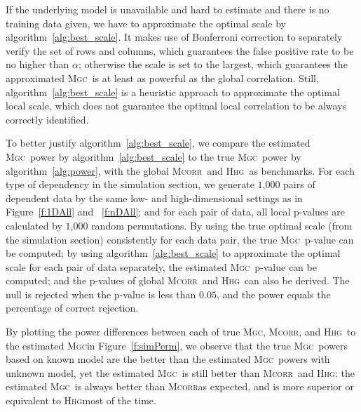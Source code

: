 \documentclass[11pt]{article}
\providecommand{\sct}[1]{{\normalfont\textsc{#1}}}
\newcommand{\Mgc}{\sct{Mgc}}
\newcommand{\Hhg}{\sct{Hhg}}
\newcommand{\Mcorr}{\sct{Mcorr}}
\begin{document}
If the underlying model is unavailable and hard to estimate and there is no training data given, we have to approximate the optimal scale by algorithm~\ref{alg:best_scale}. It makes use of Bonferroni correction to separately verify the set of rows and columns, which guarantees the false positive rate to be no higher than $\alpha$; otherwise the scale is set to the largest, which guarantees the approximated \Mgc~is at least as powerful as the global correlation. Still, algorithm~\ref{alg:best_scale} is a heuristic approach to approximate the optimal local scale, which does not guarantee the optimal local correlation to be always correctly identified.


To better justify algorithm~\ref{alg:best_scale}, we compare the estimated \Mgc~power by algorithm~\ref{alg:best_scale} to the true \Mgc~power by algorithm~\ref{alg:power}, with the global \Mcorr~and \Hhg~as benchmarks. For each type of dependency in the simulation section, we generate $1$,$000$ pairs of dependent data by the same low- and high-dimensional settings as in Figure~\ref{f:1DAll} and ~\ref{f:nDAll}; and for each pair of data, all local p-values are calculated by $1$,$000$ random permutations. By using the true optimal scale (from the simulation section) consistently for each data pair, the true \Mgc~p-value can be computed; by using algorithm~\ref{alg:best_scale} to approximate the optimal scale for each pair of data separately, the estimated \Mgc~p-value can be computed; and the p-values of global \Mcorr~and \Hhg~can also be derived. The null is rejected when the p-value is less than $0.05$, and the power equals the percentage of correct rejection. 

By plotting the power differences between each of true \Mgc, \Mcorr, and \Hhg~to the estimated \Mgc in Figure~\ref{f:simPerm}, we observe that the true \Mgc~powers based on known model are the better than the estimated \Mgc~powers with unknown model, yet the estimated \Mgc~is still better than \Mcorr~and \Hhg: the estimated \Mgc~is always better than \Mcorr as expected, and is more superior or equivalent to \Hhg most of the time.
\end{document}
